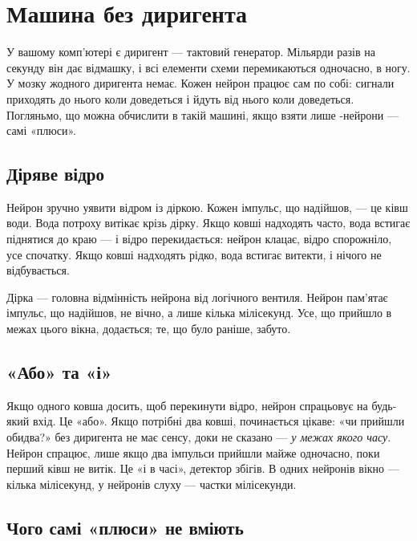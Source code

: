 \chapter{Машина без диригента}

У вашому комп'ютері є диригент --- тактовий генератор. Мільярди разів на секунду він дає відмашку, і всі елементи схеми перемикаються одночасно, в ногу. У мозку жодного диригента немає. Кожен нейрон працює сам по собі: сигнали приходять до нього коли доведеться і йдуть від нього коли доведеться. Погляньмо, що можна обчислити в такій машині, якщо взяти лише -нейрони --- самі «плюси».

\section*{Діряве відро}

Нейрон зручно уявити відром із діркою. Кожен імпульс, що надійшов, --- це ківш води. Вода потроху витікає крізь дірку. Якщо ковші надходять часто, вода встигає піднятися до краю --- і відро перекидається: нейрон клацає, відро спорожніло, усе спочатку. Якщо ковші надходять рідко, вода встигає витекти, і нічого не відбувається.


Дірка --- головна відмінність нейрона від логічного вентиля. Нейрон пам'ятає імпульс, що надійшов, не вічно, а лише кілька мілісекунд. Усе, що прийшло в межах цього вікна, додається; те, що було раніше, забуто.

\section*{«Або» та «і»}

Якщо одного ковша досить, щоб перекинути відро, нейрон спрацьовує на будь-який вхід. Це «або». Якщо потрібні два ковші, починається цікаве: «чи прийшли обидва?» без диригента не має сенсу, доки не сказано --- \emph{у межах якого часу}. Нейрон спрацює, лише якщо два імпульси прийшли майже одночасно, поки перший ківш не витік. Це «і в часі», детектор збігів. В одних нейронів вікно --- кілька мілісекунд, у нейронів слуху --- частки мілісекунди.

\section*{Чого самі «плюси» не вміють}

